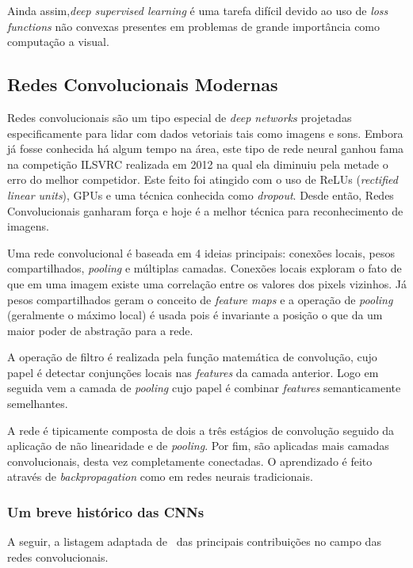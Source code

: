 Ainda assim,\emph{deep supervised learning} é uma tarefa difícil devido ao uso
de \emph{loss functions} não convexas presentes em problemas de grande
importância como computação a visual.

\subsection{Redes Convolucionais Modernas}

Redes convolucionais são um tipo especial de \emph{deep networks} projetadas
especificamente para lidar com dados vetoriais tais como imagens e sons.
Embora já fosse conhecida há algum tempo na área, este tipo de rede neural
ganhou fama na competição ILSVRC realizada em 2012 na qual ela diminuiu pela
metade o erro do melhor competidor. Este feito foi atingido com o uso de ReLUs
(\emph{rectified linear units}), GPUs e uma técnica conhecida como
\emph{dropout}. Desde então, Redes Convolucionais ganharam força e hoje é a
melhor técnica para reconhecimento de imagens.\cite{lecun2015deep}

Uma rede convolucional é baseada em 4 ideias principais: conexões locais, pesos
compartilhados, \emph{pooling} e múltiplas camadas. Conexões locais exploram o
fato de que em uma imagem existe uma correlação entre os valores dos pixels
vizinhos. Já pesos compartilhados geram o conceito de \emph{feature maps} e a
operação de \emph{pooling} (geralmente o máximo local) é usada pois é
invariante a posição o que da um maior poder de abstração para a
rede.\cite{lecun2015deep}

A operação de filtro é realizada pela função matemática de convolução, cujo
papel é detectar conjunções locais nas \emph{features} da camada anterior. Logo
em seguida vem a camada de \emph{pooling} cujo papel é combinar \emph{features}
semanticamente semelhantes.\cite{lecun2015deep}

A rede é tipicamente composta de dois a três estágios de convolução seguido da
aplicação de não linearidade e de \emph{pooling}. Por fim, são aplicadas mais
camadas convolucionais, desta vez completamente conectadas. O aprendizado é
feito através de \emph{backpropagation} como em redes neurais
tradicionais.\cite{lecun2015deep}

\subsubsection{Um breve histórico das CNNs}

A seguir, a listagem adaptada de~\cite{cs231n} das principais contribuições no
campo das redes convolucionais.

